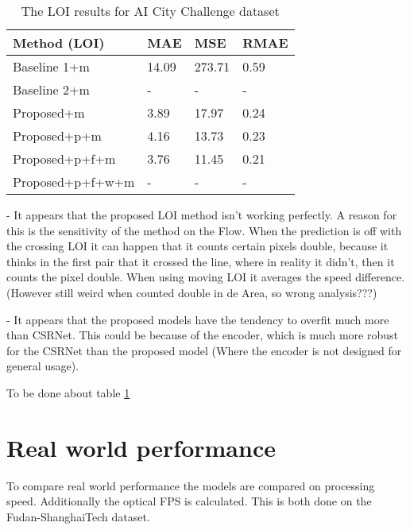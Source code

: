 \begin{table}[!htb]
	\begin{minipage}{.5\linewidth}
      \centering
		\begin{tabular}{llll}
		\hline
		Method (LOI)                               & MAE & MSE & RMAE \\ \hline
		\multicolumn{1}{l|}{Baseline 1+m}          & 14.09 & 273.71 & 0.59 \\
		\multicolumn{1}{l|}{Baseline 2+m}      & - & - & - \\
		\multicolumn{1}{l|}{Proposed+m}        	 & 3.89 & 17.97 & 0.24 \\
		\multicolumn{1}{l|}{Proposed+p+m}        & 4.16 & 13.73 & 0.23 \\
		\multicolumn{1}{l|}{Proposed+p+f+m}        & 3.76 & 11.45 & 0.21 \\
		\multicolumn{1}{l|}{Proposed+p+f+w+m}        & - & - & - \\ \hline
		\end{tabular}
		\caption{\label{tab:loi_aicity}The LOI results for AI City Challenge dataset}
	\end{minipage}
\end{table}


- It appears that the proposed LOI method isn't working perfectly. A reason for this is the sensitivity of the method on the Flow. When the prediction is off with the crossing LOI it can happen that it counts certain pixels double, because it thinks in the first pair that it crossed the line, where in reality it didn't, then it counts the pixel double. When using moving LOI it averages the speed difference. (However still weird when counted double in de Area, so wrong analysis???)

- It appears that the proposed models have the tendency to overfit much more than CSRNet. This could be because of the encoder, which is much more robust for the CSRNet than the proposed model (Where the encoder is not designed for general usage).

To be done about table \ref{tab:loi_aicity}


\section{Real world performance}
To compare real world performance the models are compared on processing speed. Additionally the optical FPS is calculated. This is both done on the Fudan-ShanghaiTech dataset.

